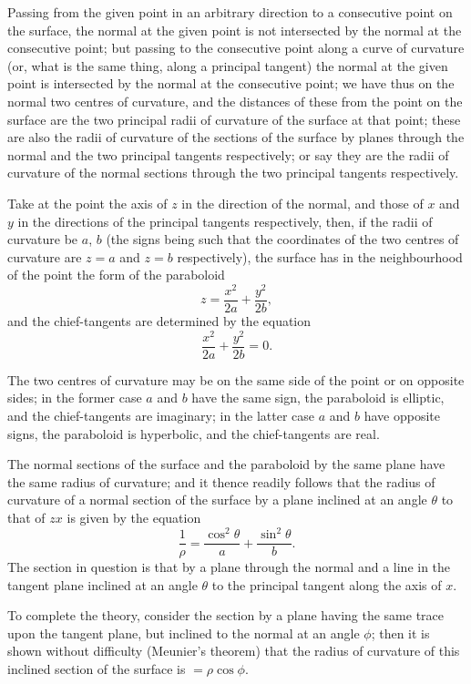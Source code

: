 \documentclass[11pt,a4paper]{book}
\begin{document}
Passing from the given point in an arbitrary direction to a consecutive point on the surface, the normal at the given point is not intersected by the normal at the consecutive point; but passing to the consecutive point along a curve of curvature (or, what is the same thing, along a principal tangent) the normal at the given point is intersected by the normal at the consecutive point; we have thus on the normal two centres of curvature, and the distances of these from the point on the surface are the two principal radii of curvature of the surface at that point; these are also the radii of curvature of the sections of the surface by planes through the normal and the two principal tangents respectively; or say they are the radii of curvature of the normal sections through the two principal tangents respectively.

Take at the point the axis of $z$ in the direction of the normal, and those of $x$ and $y$ in the directions of the principal tangents respectively, then, if the radii of curvature be $a$, $b$ (the signs being such that the coordinates of the two centres of curvature are $z = a$ and $z = b$ respectively), the surface has in the neighbourhood of the point the form of the paraboloid
\[
z = \frac{x^{2}}{2a} + \frac{y^{2}}{2b},
\]
and the chief-tangents are determined by the equation
\[
\frac{x^{2}}{2a} + \frac{y^{2}}{2b} = 0.
\]

The two centres of curvature may be on the same side of the point or on opposite sides; in the former case $a$ and $b$ have the same sign, the paraboloid is elliptic, and the chief-tangents are imaginary; in the latter case $a$ and $b$ have opposite signs, the paraboloid is hyperbolic, and the chief-tangents are real.

The normal sections of the surface and the paraboloid by the same plane have the same radius of curvature; and it thence readily follows that the radius of curvature of a normal section of the surface by a plane inclined at an angle $\theta$ to that of $zx$ is given by the equation
\[
\frac{1}{\rho} = \frac{\cos^{2}\theta}{a} + \frac{\sin^{2}\theta}{b}.
\]
The section in question is that by a plane through the normal and a line in the tangent plane inclined at an angle $\theta$ to the principal tangent along the axis of $x$.

To complete the theory, consider the section by a plane having the same trace upon the tangent plane, but inclined to the normal at an angle $\phi$; then it is shown without difficulty (Meunier's theorem) that the radius of curvature of this inclined section of the surface is $= \rho \cos\phi$.
\end{document}
